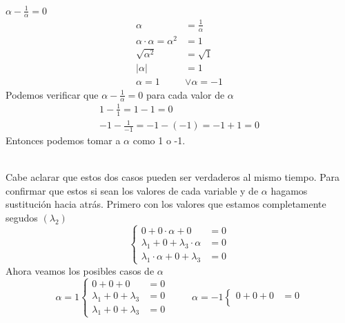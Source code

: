 \documentclass{article}
\begin{document}
\begin{enumerate}
\begin{mathcase}{\(\alpha - \frac{1}{\alpha} = 0\)}
            \[
                \begin{aligned}
                    \alpha &= \frac{1}{\alpha} \\
                    \alpha \cdot \alpha = \alpha^2 &= 1 \\
                    \sqrt{\alpha^2} &= \sqrt{1} \\
                    |\alpha| &= 1 \\
                    \alpha = 1 &\vee \alpha = -1
                \end{aligned}
            \]
            Podemos verificar que \(\alpha - \frac{1}{\alpha} = 0\) para cada valor de \(\alpha\)
            \[
                \begin{gathered}
                    1 - \frac{1}{1} = 1 - 1 = 0 \\
                    -1 - \frac{1}{-1} = -1 - (-1) = -1 + 1 = 0
                \end{gathered}
            \]
            Entonces podemos tomar a \(\alpha\) como 1 o -1.
        \end{mathcase} \\
        Cabe aclarar que estos dos casos pueden ser verdaderos al mismo tiempo. Para confirmar que estos si sean los valores de cada variable y de \(\alpha\) 
        hagamos sustitución hacia atrás. Primero con los valores que estamos completamente segudos \((\lambda_2)\)
        \[
            \left\{
                \begin{aligned}
                    0 + 0 \cdot \alpha + 0 &= 0 \\
                    \lambda_1 + 0 + \lambda_3 \cdot \alpha &= 0 \\
                    \lambda_1 \cdot \alpha + 0 + \lambda_3 &= 0
                \end{aligned}
            \right.
        \]
        Ahora veamos los posibles casos de \(\alpha\)
        \[
            \alpha = 1
            \left\{
                \begin{aligned}
                    0 + 0 + 0 &= 0 \\
                    \lambda_1 + 0 + \lambda_3 &= 0 \\
                    \lambda_1 + 0 + \lambda_3 &= 0
                \end{aligned}
            \right.
            \hspace{1cm}
            \alpha = -1
            \left\{
                \begin{aligned}
                    0 + 0 + 0 &= 0 \\

\end{aligned}\]
\end{enumerate}
\end{document}
